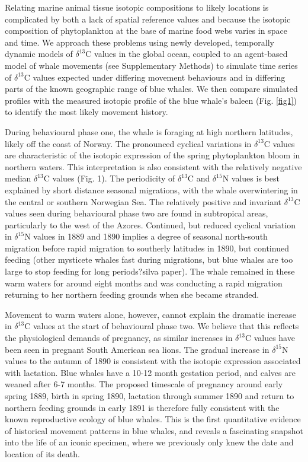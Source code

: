 \documentclass[a4paper,12pt]{article}
\begin{document}
Relating marine animal tissue isotopic compositions to likely locations is complicated by both a lack of spatial reference values and because the isotopic composition of phytoplankton at the base of marine food webs varies in space and time. 
We approach these problems using newly developed, temporally dynamic models of $\delta^{13}$C values in the global ocean\cite{magozzi2017using}, coupled to an agent-based model of whale movements (see Supplementary Methods) to simulate time series of $\delta^{13}$C values expected under differing movement behaviours and in differing parts of the known geographic range of blue whales. 
We then compare simulated profiles with the measured isotopic profile of the blue whale's baleen (Fig. \ref{fig1}) to identify the most likely movement history.
 
During behavioural phase one, the whale is foraging at high northern latitudes, likely off the coast of Norway. 
The pronounced cyclical variations in $\delta^{13}$C values are characteristic of the isotopic expression of the spring phytoplankton bloom in northern waters\cite{magozzi2017using}. 
This interpretation is also consistent with the relatively negative median $\delta^{13}$C values (Fig. 1). 
The periodicity of $\delta^{13}$C and $\delta^{15}$N values is best explained by short distance seasonal migrations, with the whale overwintering in the central or southern Norwegian Sea. 
The relatively positive and invariant $\delta^{13}$C values seen during behavioural phase two are found in subtropical areas, particularly to the west of the Azores.
Continued, but reduced cyclical variation in $\delta^{15}$N values in 1889 and 1890 implies a degree of seasonal north-south migration before rapid migration to southerly latitudes in 1890, but continued feeding (other mysticete whales fast during migrations, but blue whales are too large to stop feeding for long periods\cite{busquets2017estimating}?silva paper). 
The whale remained in these warm waters for around eight months and was conducting a rapid migration returning to her northern feeding grounds when she became stranded. 
 
Movement to warm waters alone, however, cannot explain the dramatic increase in $\delta^{13}$C values at the start of behavioural phase two. 
We believe that this reflects the physiological demands of pregnancy, as similar increases in $\delta^{13}$C values have been seen in pregnant South American sea lions\cite{cardona2017temporal}. 
The gradual increase in $\delta^{15}$N values to the autumn of 1890 is consistent with the isotopic expression associated with lactation\cite{cardona2017temporal}. Blue whales have a 10-12 month gestation period, and calves are weaned after 6-7 months\cite{handbook}. 
The proposed timescale of pregnancy around early spring 1889, birth in spring 1890, lactation through summer 1890 and return to northern feeding grounds in early 1891 is therefore fully consistent with the known reproductive ecology of blue whales. 
This is the first quantitative evidence of historical movement patterns in blue whales, and reveals a fascinating snapshot into the life of an iconic specimen, where we previously only knew the date and location of its death. 
 
\end{document}
